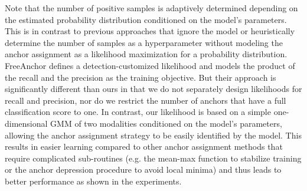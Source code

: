 \documentclass[runningheads]{llncs}
\begin{document}
Note that the number of positive samples is adaptively determined depending on the estimated probability distribution conditioned on the model's parameters. This is in contrast to previous approaches that ignore the model\cite{atss} or heuristically determine the number of samples as a hyperparameter\cite{mal, noisy} without modeling the anchor assignment as a likelihood maximization for a probability distribution. FreeAnchor\cite{freeanchor} defines a detection-customized likelihood and models the product of the recall and the precision as the training objective. But their approach is significantly different than ours in that we do not separately design likelihoods for recall and precision, nor do we restrict the number of anchors that have a full classification score to one. In contrast, our likelihood is based on a simple one-dimensional GMM of two modalities conditioned on the model's parameters, allowing the anchor assignment strategy to be easily identified by the model. This results in easier learning compared to other anchor assignment methods that require complicated sub-routines (e.g. the mean-max function to stabilize training\cite{freeanchor} or the anchor depression procedure to avoid local minima\cite{mal}) and thus leads to better performance as shown in the experiments.
\end{document}
